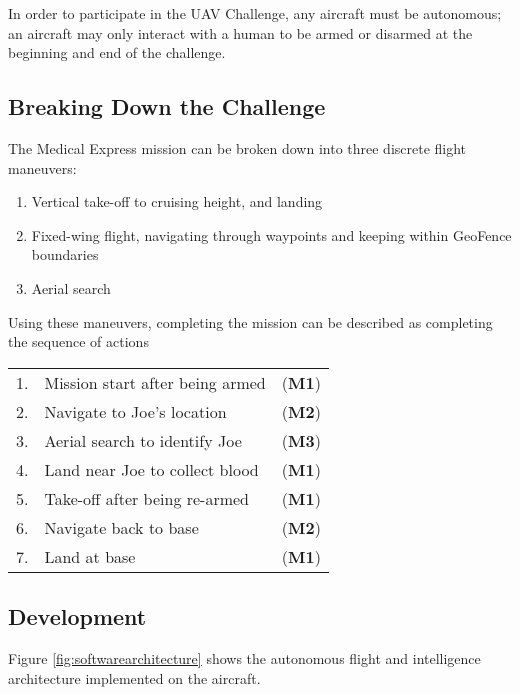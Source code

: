 In order to participate in the UAV Challenge, any aircraft must be autonomous; an aircraft may only interact with a human to be armed or disarmed at the beginning and end of the challenge.

\subsection{Breaking Down the Challenge}
\label{sec:flight}
The Medical Express mission can be broken down into three discrete flight maneuvers:
\begin{enumerate}[label=\bfseries M\arabic*:] \itemsep-2pt
	\item Vertical take-off to cruising height, and landing
	\item Fixed-wing flight, navigating through waypoints and keeping within GeoFence boundaries
	\item Aerial search
\end{enumerate}

Using these maneuvers, completing the mission can be described as completing the sequence of actions\\
\begin{tabular}{r l l}
	1. & Mission start after being armed & (\textbf{M1}) \\ 
	2. & Navigate to Joe's location & (\textbf{M2}) \\ 
	3. & Aerial search to identify Joe & (\textbf{M3}) \\ 
	4. & Land near Joe to collect blood & (\textbf{M1}) \\ 
	5. & Take-off after being re-armed & (\textbf{M1}) \\ 
	6. & Navigate back to base & (\textbf{M2}) \\ 
	7. & Land at base & (\textbf{M1}) \\ 
\end{tabular} 

\subsection{Development}
Figure \ref{fig:softwarearchitecture} shows the autonomous flight and intelligence architecture implemented on the aircraft.



